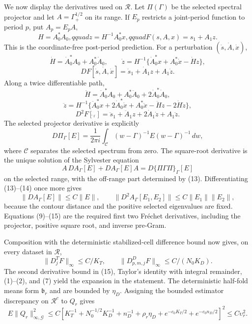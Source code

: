 We now display the derivatives used on \(\mathcal R\).  Let \(\Pi(\Gamma)\)
be the selected spectral projector and let \(A=\Gamma_+^{1/2}\) on its
range.  If \(E_p\) restricts a joint-period function to period \(p\), put
\(A_p=E_pA\),
\[
 H=A_0^*A_0,qquad z=H^{-1}A_0^*x,qquad
 F(s,A,x)=s_1+A_1z.                                       \tag{8}
\]
This is the coordinate-free post-period prediction.  For a perturbation
\((\dot s,\dot A,\dot x)\),
\[
 \dot H=\dot A_0^*A_0+A_0^*\dot A_0,
 \qquad
 \dot z=H^{-1}\{\dot A_0^*x+A_0^*\dot x-\dot Hz\},       \tag{9}
\]
\[
 DF[\dot s,\dot A,\dot x]
 =\dot s_1+\dot A_1z+A_1\dot z.                           \tag{10}
\]
Along a twice differentiable path,
\[
 \ddot H=\ddot A_0^*A_0+A_0^*\ddot A_0+2\dot A_0^*\dot A_0,
\]
\[
 \ddot z=H^{-1}\{\ddot A_0^*x+2\dot A_0^*\dot x
 +A_0^*\ddot x-\ddot Hz-2\dot H\dot z\},                 \tag{11}
\]
\[
 D^2F[\dot{},\dot{}]
 =\ddot s_1+\ddot A_1z+2\dot A_1\dot z+A_1\ddot z.       \tag{12}
\]
The selected projector derivative is explicitly
\[
 D\Pi_\Gamma[E]
 =\frac1{2\pi i}\int_{\mathscr C}
 (w-\Gamma)^{-1}E(w-\Gamma)^{-1}\,dw,                    \tag{13}
\]
where \(\mathscr C\) separates the selected spectrum from zero.  The
square-root derivative is the unique solution of the Sylvester equation
\[
 A\,DA_\Gamma[E]+DA_\Gamma[E]A
 =D\{\Pi\Gamma\Pi\}_\Gamma[E]                             \tag{14}
\]
on the selected range, with the off-range part determined by (13).
Differentiating (13)--(14) once more gives
\[
 \|DA_\Gamma[E]\|\le C\|E\|,
 \qquad
 \|D^2A_\Gamma[E_1,E_2]\|
 \le C\|E_1\|\|E_2\|,                                   \tag{15}
\]
because the contour distance and the positive selected eigenvalues are
fixed.  Equations (9)--(15) are the required first two Fr\'echet
derivatives, including the projector, positive square root, and inverse
pre-Gram.

Composition with the deterministic stabilized-cell difference bound now
gives, on every dataset in \(\mathcal R\),
\[
 \|D_j^TF\|_\infty\le C/K_T,
 \qquad
 \|D_{p,m,j}^DF\|_\infty\le C/(N_0K_D).                   \tag{16}
\]
The second derivative bound in (15), Taylor's identity with integral
remainder, (1)--(2), and (7) yield the expansion in the statement.  The
deterministic half-fold means form \(\mathfrak b_r\) and are bounded by
\(\eta_D\).  Assigning the bounded estimator discrepancy on
\(\mathcal R^c\) to \(Q_r\) gives
\[
 E\|Q_r\|_{\infty,\mathcal G}^2
 \le C\left[K_T^{-1}+N_0^{-1/2}K_D^{-1}+n_D^{-1}
 +\rho_r\eta_D+e^{-c_0K_T/2}+e^{-c_0n_D/2}\right]^2
 \le C\upsilon_r^2.                                       \tag{17}
\]

